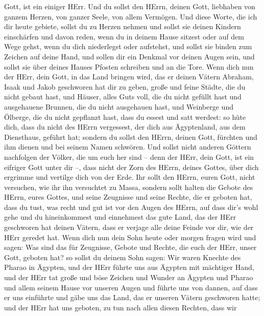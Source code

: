 Gott, ist ein einiger HErr.  Und du sollst den HErrn, deinen
Gott, liebhaben von ganzem Herzen, von ganzer Seele, von allem Vermögen.
 Und diese Worte, die ich dir heute gebiete, sollst du zu
Herzen nehmen  und sollst sie deinen Kindern einschärfen und
davon reden, wenn du in deinem Hause sitzest oder auf dem Wege gehst,
wenn du dich niederlegst oder aufstehst,  und sollst sie
binden zum Zeichen auf deine Hand, und sollen dir ein Denkmal vor deinen
Augen sein,  und sollst sie über deines Hauses Pfosten
schreiben und an die Tore.  Wenn dich nun der HErr, dein
Gott, in das Land bringen wird, das er deinen Vätern Abraham, Isaak und
Jakob geschworen hat dir zu geben, große und feine Städte, die du nicht
gebaut hast,  und Häuser, alles Guts voll, die du nicht
gefüllt hast und ausgehauene Brunnen, die du nicht ausgehauen hast, und
Weinberge und Ölberge, die du nicht gepflanzt hast, dass du essest und
satt werdest:  so hüte dich, dass du nicht des HErrn
vergessest, der dich aus Ägyptenland, aus dem Diensthaus, geführt hat;
 sondern du sollst den HErrn, deinen Gott, fürchten und ihm
dienen und bei seinem Namen schwören.  Und sollst nicht
anderen Göttern nachfolgen der Völker, die um euch her sind --
 denn der HErr, dein Gott, ist ein eifriger Gott unter dir
--, dass nicht der Zorn des HErrn, deines Gottes, über dich ergrimme und
vertilge dich von der Erde.  Ihr sollt den HErrn, euren
Gott, nicht versuchen, wie ihr ihn versuchtet zu Massa, 
sondern sollt halten die Gebote des HErrn, eures Gottes, und seine
Zeugnisse und seine Rechte, die er geboten hat,  dass du
tust, was recht und gut ist vor den Augen des HErrn, auf dass dir's wohl
gehe und du hineinkommest und einnehmest das gute Land, das der HErr
geschworen hat deinen Vätern,  dass er verjage alle deine
Feinde vor dir, wie der HErr geredet hat.  Wenn dich nun
dein Sohn heute oder morgen fragen wird und sagen: Was sind das für
Zeugnisse, Gebote und Rechte, die euch der HErr, unser Gott, geboten
hat?  so sollst du deinem Sohn sagen: Wir waren Knechte des
Pharao in Ägypten, und der HErr führte uns aus Ägypten mit mächtiger
Hand,  und der HErr tat große und böse Zeichen und Wunder
an Ägypten und Pharao und allem seinem Hause vor unseren Augen
 und führte uns von dannen, auf dass er uns einführte und
gäbe uns das Land, das er unseren Vätern geschworen hatte; 
und der HErr hat uns geboten, zu tun nach allen diesen Rechten, dass wir
